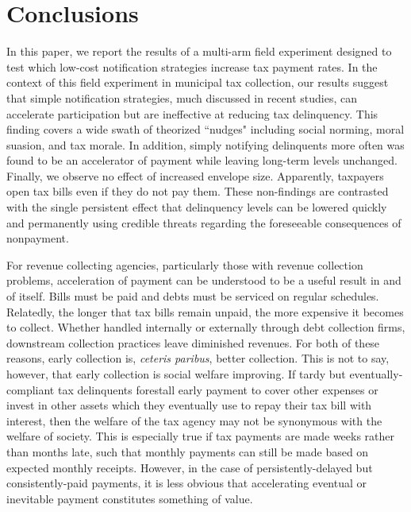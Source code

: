 \documentclass[12pt,titlepage]{article}
\begin{document}
\section{Conclusions}

In this paper, we report the results of a multi-arm field experiment 
designed to test which low-cost notification strategies increase tax 
payment rates. In the context of this field experiment in municipal 
tax collection, our results suggest that simple notification strategies, 
much discussed in recent studies, can accelerate participation but are 
ineffective at reducing tax delinquency. This finding covers a 
wide swath of theorized  ``nudges" including social norming, moral suasion, 
and tax morale. In addition, simply notifying delinquents more often was 
found to be an accelerator of payment while leaving long-term levels 
unchanged. Finally, we observe no effect of increased envelope size. 
Apparently, taxpayers open tax bills even if they do not pay them.
These non-findings are contrasted with the single persistent effect 
that delinquency levels can be lowered quickly and permanently using 
credible threats regarding the foreseeable consequences of nonpayment. 

For revenue collecting agencies, particularly those with revenue collection 
problems, acceleration of payment can be understood to be a useful result 
in and of itself. Bills must be paid and debts must be serviced on regular 
schedules. Relatedly, the longer that tax bills remain unpaid, the more 
expensive it becomes to collect. Whether handled internally or externally 
through debt collection firms, downstream collection practices leave 
diminished revenues. For both of these reasons, early collection is, 
\textit{ceteris paribus}, better collection. This is not to say, 
however, that early collection is social welfare improving. If tardy 
but eventually-compliant tax delinquents forestall early payment to 
cover other expenses or invest in other assets which they eventually 
use to repay their tax bill with interest, then the welfare of the tax 
agency may not be synonymous with the welfare of society. This is 
especially true if tax payments are made weeks rather than months late, 
such that monthly payments can still be made based on expected monthly 
receipts. However, in the case of persistently-delayed but consistently-paid 
payments, it is less obvious that accelerating eventual or inevitable 
payment constitutes something of value. 
\end{document}
